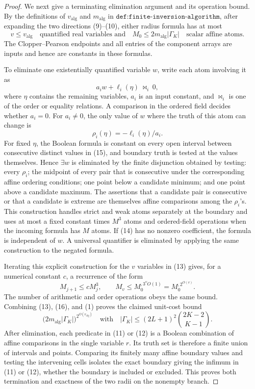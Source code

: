 \documentclass{article}
\begin{document}
\begin{proof}
We next give a terminating elimination argument and its operation bound.  By the definitions of \(v_{\mathrm{alg}}\) and \(m_{\mathrm{alg}}\) in \(\texttt{def:finite-inversion-algorithm}\), after expanding the two directions (9)--(10), either radius formula has at most
\[
 v\leq v_{\mathrm{alg}}
 \quad\text{quantified real variables and}\quad
 M_0\leq 2m_{\mathrm{alg}}|\Gamma_K|
 \quad\text{scalar affine atoms}.
 \tag{13}
\]
The Clopper--Pearson endpoints and all entries of the component arrays are inputs and hence are constants in these formulas.

To eliminate one existentially quantified variable \(w\), write each atom involving it as
\[
 a_iw+\ell_i(\eta)\ \mathrel{\bowtie_i}\ 0,
 \tag{14}
\]
where \(\eta\) contains the remaining variables, \(a_i\) is an input constant, and \(\bowtie_i\) is one of the order or equality relations.  A comparison in the ordered field decides whether \(a_i=0\).  For \(a_i\neq0\), the only value of \(w\) where the truth of this atom can change is
\[
 \rho_i(\eta)=-\ell_i(\eta)/a_i.
 \tag{15}
\]
For fixed \(\eta\), the Boolean formula is constant on every open interval between consecutive distinct values in (15), and boundary truth is tested at the values themselves.  Hence \(\exists w\) is eliminated by the finite disjunction obtained by testing: every \(\rho_i\); the midpoint of every pair that is consecutive under the corresponding affine ordering conditions; one point below a candidate minimum; and one point above a candidate maximum.  The assertions that a candidate pair is consecutive or that a candidate is extreme are themselves affine comparisons among the \(\rho_i\)'s.  This construction handles strict and weak atoms separately at the boundary and uses at most a fixed constant times \(M^3\) atoms and ordered-field operations when the incoming formula has \(M\) atoms.  If (14) has no nonzero coefficient, the formula is independent of \(w\).  A universal quantifier is eliminated by applying the same construction to the negated formula.

Iterating this explicit construction for the \(v\) variables in (13) gives, for a numerical constant \(c\), a recurrence of the form
\[
 M_{j+1}\leq cM_j^3,
 \qquad
 M_v\leq M_0^{,3^{v}O(1)}=M_0^{,2^{O(v)}}.
 \tag{16}
\]
The number of arithmetic and order operations obeys the same bound.  Combining (13), (16), and (1) proves the claimed unit-cost bound
\[
 \bigl(2m_{\mathrm{alg}}|\Gamma_K|\bigr)^{2^{O(v_{\mathrm{alg}})}}
 \quad\text{with}\quad
 |\Gamma_K|\leq(2L+1)^2\binom{2K-2}{K-1}.
 \tag{17}
\]
After elimination, each predicate in (11) or (12) is a Boolean combination of affine comparisons in the single variable \(r\).  Its truth set is therefore a finite union of intervals and points.  Comparing its finitely many affine boundary values and testing the intervening cells isolates the exact boundary giving the infimum in (11) or (12), whether the boundary is included or excluded.  This proves both termination and exactness of the two radii on the nonempty branch.


\end{proof}
\end{document}
